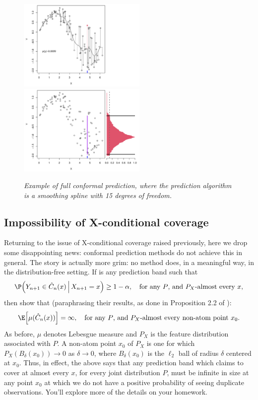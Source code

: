 \documentclass{article}
\begin{document}
\begin{figure}[p]
\hspace{-10pt}
\includegraphics[width=0.55\textwidth]{fig_full/21.pdf} 
\hspace{-50pt}
\includegraphics[width=0.55\textwidth]{fig_full/28.pdf} 
\caption{\it Example of full conformal prediction, where the prediction
  algorithm is a smoothing spline with 15 degrees of freedom.}
\label{fig:full}
\end{figure}

\subsection{Impossibility of X-conditional coverage}
\label{sec:impossibility}

Returning to the issue of X-conditional coverage raised previously, here we drop
some disappointing news: conformal prediction methods do not achieve this in
general. The story is actually more grim: no method does, in a meaningful
way, in the distribution-free setting. If  is any prediction band
such that  
\[
\P\Big( Y_{n+1} \in \hC_n(x) \, \Big| \, X_{n+1} = x \Big) \geq 1-\alpha, \quad 
\text{for any $P$, and $P_X$-almost every $x$},
\]
then \citet{lei2014distribution, vovk2012conditional} show that (paraphrasing
their results, as done in Proposition 2.2 of \citet{barber2021limits}):
\[
\E \Big[ \mu(\hC_n(x)) \Big] = \infty, \quad \text{for any $P$, and
  $P_X$-almost every non-atom point $x_0$}. 
\]
As before, $\mu$ denotes Lebesgue measure and $P_X$ is the feature distribution
associated with $P$. A non-atom point $x_0$ of $P_X$ is one for which
$P_X(B_\delta(x_0)) \to 0$ as $\delta \to 0$, where $B_\delta(x_0)$ is the
$\ell_2$ ball of radius $\delta$ centered at $x_0$. Thus, in effect, the above
says that any prediction band which claims to cover at almost every $x$, for
every joint distribution $P$, must be infinite in size at any point $x_0$ at
which we do not have a positive probability of seeing duplicate observations. 
You'll explore more of the details on your homework.  
\end{document}
